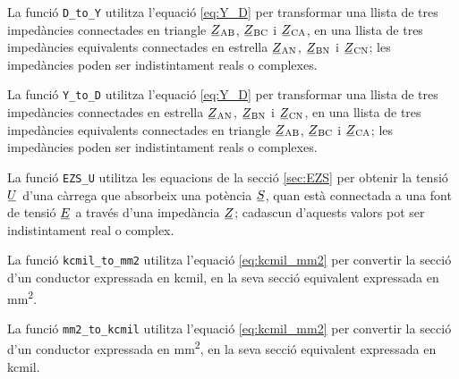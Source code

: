 


La funció \texttt{D\_to\_Y} utilitza l'equació \eqref{eq:Y_D} per transformar una llista de tres impedàncies connectades en triangle $\cmplx{Z}\ped{AB}$, $\cmplx{Z}\ped{BC}$ i  $\cmplx{Z}\ped{CA}$, en una llista de tres impedàncies equivalents connectades en estrella $\cmplx{Z}\ped{AN}$, $\cmplx{Z}\ped{BN}$ i $\cmplx{Z}\ped{CN}$; les impedàncies poden ser indistintament reals o complexes.




La funció \texttt{Y\_to\_D} utilitza l'equació \eqref{eq:Y_D} per transformar una llista de tres impedàncies connectades en estrella $\cmplx{Z}\ped{AN}$, $\cmplx{Z}\ped{BN}$ i $\cmplx{Z}\ped{CN}$, en una llista de tres impedàncies equivalents connectades en triangle $\cmplx{Z}\ped{AB}$, $\cmplx{Z}\ped{BC}$ i  $\cmplx{Z}\ped{CA}$; les impedàncies poden ser indistintament reals o complexes.




La funció \texttt{EZS\_U} utilitza les equacions de la secció \vref{sec:EZS} per obtenir la tensió $\cmplx{U}$ d'una càrrega que absorbeix una potència $\cmplx{S}$, quan està connectada a una font de tensió $\cmplx{E}$ a través d'una impedància $\cmplx{Z}$; cadascun d'aquests valors pot ser indistintament real o complex.




La funció \texttt{kcmil\_to\_mm2} utilitza l'equació \eqref{eq:kcmil_mm2} per convertir la secció d'un conductor expressada en \unit{kcmil}, en la seva secció equivalent expressada en \unit{mm^2}.




La funció \texttt{mm2\_to\_kcmil} utilitza l'equació \eqref{eq:kcmil_mm2} per convertir la secció d'un conductor expressada en \unit{mm^2}, en la seva secció equivalent expressada en \unit{kcmil}.

